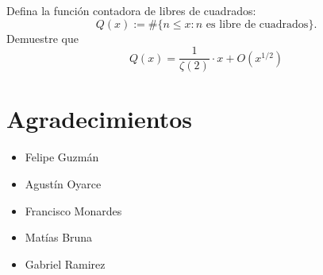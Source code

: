 \begin{prob}
	Defina la función contadora de libres de cuadrados:
	\[Q(x):=\#\{n\leq x: n\text{ es libre de cuadrados}\}.\]
	Demuestre que
	\[Q(x)=\frac{1}{\zeta(2)}\cdot x+O(x^{1/2})\]
\end{prob}

\begin{sol}

\end{sol}

\section{Agradecimientos}
\begin{multicols}{3}
    \begin{itemize}
        \item Felipe Guzmán

        \item Agustín Oyarce

        \item Francisco Monardes

        \item Matías Bruna

        \item Gabriel Ramirez
    \end{itemize}
\end{multicols}



